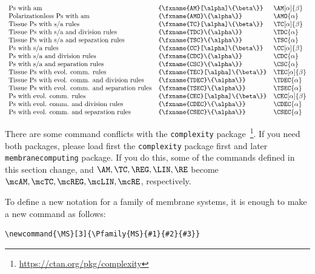 \documentclass{article}
\begin{document}
$
\begin{array}{lll}
  \mbox{Ps with am} & \verb=\AM[\alpha]{\beta}= & \AM[\alpha]{\beta} \\
  \mbox{Polarizationless Ps with am} & \verb=\AMO{\alpha}= & \AMO{\alpha} \\
  \mbox{Tissue Ps with s/a rules} & \verb=\TC[\alpha]{\beta}= & \TC[\alpha]{\beta} \\
  \mbox{Tissue Ps with s/a and division rules} & \verb=\TDC{\alpha}= & \TDC{\alpha} \\
  \mbox{Tissue Ps with s/a and separation rules} & \verb=\TSC{\alpha}= & \TSC{\alpha} \\
  \mbox{Ps with s/a rules} & \verb=\CC[\alpha]{\beta}= & \CC[\alpha]{\beta} \\
  \mbox{Ps with s/a and division rules} & \verb=\CDC{\alpha}= & \CDC{\alpha} \\
  \mbox{Ps with s/a and separation rules} & \verb=\CSC{\alpha}= & \CSC{\alpha} \\
  \mbox{Tissue Ps with evol. comm. rules} & \verb=\TEC[\alpha]{\beta}= & \TEC[\alpha]{\beta} \\
  \mbox{Tissue Ps with evol. comm. and division rules} & \verb=\TDEC{\alpha}= & \TDEC{\alpha} \\
  \mbox{Tissue Ps with evol. comm. and separation rules} & \verb=\TSEC{\alpha}= & \TSEC{\alpha} \\
  \mbox{Ps with evol. comm. rules} & \verb=\CEC[\alpha]{\beta}= & \CEC[\alpha]{\beta} \\
  \mbox{Ps with evol. comm. and division rules} & \verb=\CDEC{\alpha}= & \CDEC{\alpha} \\
  \mbox{Ps with evol. comm. and separation rules} & \verb=\CSEC{\alpha}= & \CSEC{\alpha}
\end{array}
$

There are some command conflicts with the \texttt{complexity}
package~\footnote{\url{https://ctan.org/pkg/complexity}}. If you need
both packages, please load first the \texttt{complexity} package first
and later \texttt{membranecomputing} package. If you do this, some of
the commands defined in this section change, and
$\verb=\AM=, \verb=\TC=, \verb=\REG=, \verb=\LIN=, \verb=\RE=$ become
$\verb=\mcAM=, \verb=\mcTC=, \verb=\mcREG=, \verb=\mcLIN=,
\verb=\mcRE=$, respectively.

To define a new notation for a family of membrane systems, it is
enough to make a new command as follows:

\begin{verbatim}
\newcommand{\MS}[3]{\Pfamily{MS}{#1}{#2}{#3}}
\end{verbatim}
\end{document}
